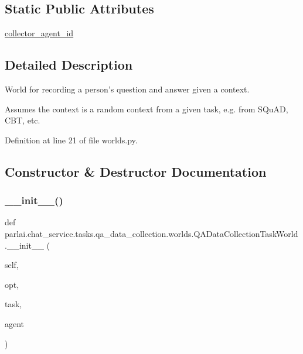 \subsection*{Static Public Attributes}
\begin{DoxyCompactItemize}
\item 
\hyperlink{classparlai_1_1chat__service_1_1tasks_1_1qa__data__collection_1_1worlds_1_1QADataCollectionTaskWorld_ae44972f4c966dee4e7051c06e77103ba}{collector\+\_\+agent\+\_\+id}
\end{DoxyCompactItemize}


\subsection{Detailed Description}
\begin{DoxyVerb}World for recording a person's question and answer given a context.

Assumes the context is a random context from a given task, e.g. from SQuAD, CBT,
etc.
\end{DoxyVerb}
 

Definition at line 21 of file worlds.\+py.



\subsection{Constructor \& Destructor Documentation}
\mbox{\label{classparlai_1_1chat__service_1_1tasks_1_1qa__data__collection_1_1worlds_1_1QADataCollectionTaskWorld_ab84f1948bc80ae0de93567ea3e4488f2}} 
\subsubsection{\texorpdfstring{\+\_\+\+\_\+init\+\_\+\+\_\+()}{\_\_init\_\_()}}
{\footnotesize\ttfamily def parlai.\+chat\+\_\+service.\+tasks.\+qa\+\_\+data\+\_\+collection.\+worlds.\+Q\+A\+Data\+Collection\+Task\+World.\+\_\+\+\_\+init\+\_\+\+\_\+ (\begin{DoxyParamCaption}\item[{}]{self,  }\item[{}]{opt,  }\item[{}]{task,  }\item[{}]{agent }\end{DoxyParamCaption})}



